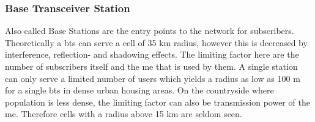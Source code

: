 \subsubsection{Base Transceiver Station}
Also called Base Stations are the entry points to the network for subscribers.
Theoretically a \gls{bts} can serve a cell of 35 km radius, however this is decreased by interference, reflection- and shadowing effects.
The limiting factor here are the number of subscribers itself and the \gls{me} that is used by them.
A single station can only serve a limited number of users which yields a radius as low as 100 m for a single \gls{bts} \cite{kommsys2006} in dense urban housing areas.
On the countryside where population is less dense, the limiting factor can also be transmission power of the \gls{me}.
Therefore cells with a radius above 15 km are seldom seen.

